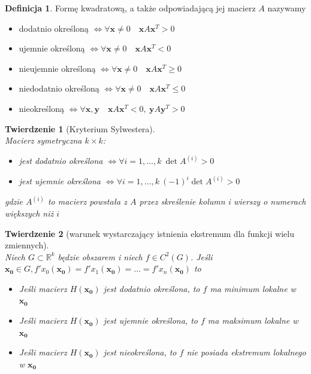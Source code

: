 \documentclass[12pt,a4paper]{article}
\newtheorem{tw}{Twierdzenie}
\theoremstyle{definition}
\newtheorem{df}{Definicja}
\begin{document}
\begin{df}
Formę kwadratową, a także odpowiadającą jej macierz $A$ nazywamy
\begin{itemize}
	\item dodatnio określoną $\Leftrightarrow \forall \mathbf{x}\neq 0 \quad \mathbf{x}A\mathbf{x}^T > 0$
	\item ujemnie określoną $\Leftrightarrow \forall \mathbf{x}\neq 0 \quad \mathbf{x}A\mathbf{x}^T < 0$
	\item nieujemnie określoną $\Leftrightarrow \forall \mathbf{x}\neq 0 \quad \mathbf{x}A\mathbf{x}^T \geqslant 0$
	\item niedodatnio określoną $\Leftrightarrow \forall \mathbf{x}\neq 0 \quad \mathbf{x}A\mathbf{x}^T \leqslant 0$	
	\item nieokreśloną $\Leftrightarrow \forall \mathbf{x,y} \quad \mathbf{x}A\mathbf{x}^T < 0,~ \mathbf{y}A\mathbf{y}^T > 0$
\end{itemize}
\end{df}

\begin{tw}[Kryterium Sylwestera]~\\
Macierz symetryczna $k\times k$:
\begin{itemize}
	\item jest dodatnio określona $\Leftrightarrow \forall i=1,\dots ,k ~ \det A^{(i)}>0$
	\item jest ujemnie określona $\Leftrightarrow \forall i=1,\dots ,k ~ (-1)^i\det A^{(i)}>0$
\end{itemize}
gdzie $A^{(i)}$ to macierz powstała z $A$ przez skreślenie kolumn i wierszy o numerach większych niż $i$
\end{tw}

\begin{tw}[warunek wystarczający istnienia ekstremum dla funkcji wielu zmiennych]~\\
Niech $G\subset \mathbb{R}^k$ będzie obszarem i niech $f\in C^2(G)$. Jeśli $\mathbf{x_0}\in G, f'x_0(\mathbf{x_0}) = f'x_1(\mathbf{x_0}) = \dots = f'x_n(\mathbf{x_0})$ to
\begin{itemize}
	\item Jeśli macierz $H(\mathbf{x_0})$ jest dodatnio określona, to $f$ ma minimum lokalne w $\mathbf{x_0}$
	\item Jeśli macierz $H(\mathbf{x_0})$ jest ujemnie określona, to $f$ ma maksimum lokalne w $\mathbf{x_0}$
	\item Jeśli macierz $H(\mathbf{x_0})$ jest nieokreślona, to $f$ nie posiada ekstremum lokalnego w $\mathbf{x_0}$
\end{itemize}
\end{tw}
\end{document}
